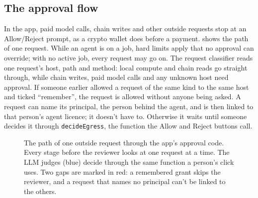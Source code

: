 \documentclass[11pt]{article}
\begin{document}
\subsection{The approval flow}

In the app, paid model calls, chain writes and other outside requests stop at an Allow/Reject prompt, as a crypto wallet
does before a payment.  shows the path of one request. While an agent is on a job, hard limits apply that
no approval can override; with no active job, every request may go on. The request classifier reads one request's host,
path and method: local compute and chain reads go straight through, while chain writes, paid model calls and any unknown
host need approval. If someone earlier allowed a request of the same kind to the same host and ticked ``remember'', the
request is allowed without anyone being asked. A request can name its principal, the person behind the agent, and is
then linked to that person's agent licence; it doesn't have to. Otherwise it waits until someone decides it through
\texttt{decideEgress}, the function the Allow and Reject buttons call.

\begin{figure}[t]
\centering
{}
\caption{The path of one outside request through the app's approval code. Every stage before the reviewer looks at one
request at a time. The LLM judges (blue) decide through the same function a person's click uses. Two gaps are marked in
red: a remembered grant skips the reviewer, and a request that names no principal can't be linked to the others.}
\label{fig:flow}
\end{figure}
\end{document}

